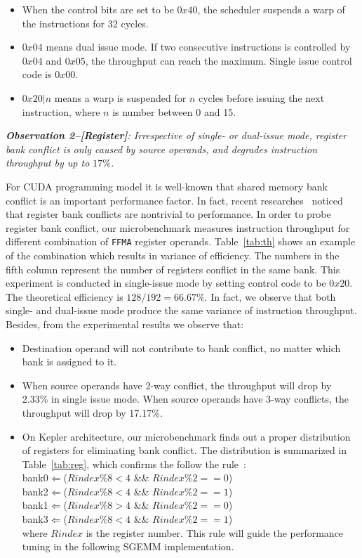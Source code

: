 \documentclass{sig-alternate-05-2015}
\begin{document}
\begin{itemize}
\item When the control bits are set to be $0x40$, the scheduler suspends a warp of the instructions for 32 cycles.
\item $0x04$ means dual issue mode. If two consecutive instructions is controlled by $0x04$ and $0x05$, the throughput can reach the maximum. Single issue control code is $0x00$.
\item $0x20|n$ means a warp is suspended for $n$ cycles before issuing the next instruction, where $n$ is number between 0 and 15.
\end{itemize}


{\em {\bf Observation 2--[Register]}: Irrespective of single- or dual-issue mode, register bank conflict is only caused by source operands, and degrades instruction throughput by up to $17\%$.}

For CUDA programming model it is well-known that shared memory bank conflict is an important performance factor. In
fact, recent researches~\cite{lai} noticed that register bank conflicts are nontrivial to performance.  In order to probe register bank conflict, our microbenchmark measures instruction throughput for different combination of {\tt FFMA} register operands. Table~\ref{tab:th} shows an example of the combination which results in variance of efficiency. The numbers in the fifth column represent the number of registers conflict in the same bank. This experiment is conducted in single-issue mode by setting control code to be $0x20$. The theoretical efficiency is $128/192=66.67\%$. In fact, we observe that both single- and dual-issue mode produce the same variance of instruction throughput. Besides, from the experimental results we observe that:
\begin{itemize}
\item Destination operand will not contribute to bank conflict, no matter which bank is assigned to it.
\item When source operands have 2-way conflict, the throughput will drop by 2.33\% in single issue
    mode. When source operands have 3-way conflicts, the throughput will drop by 17.17\%.

 \item On Kepler architecture, our microbenchmark finds out a proper distribution of registers for eliminating bank
     conflict. The distribution is summarized in Table~\ref{tab:reg}, which confirms the follow the rule~\cite{lai}: \\
 bank0$\Leftarrow$($Rindex \% 8 < 4$ \&\& $Rindex \% 2 == 0$) \\
 bank2$\Leftarrow$($Rindex \% 8 < 4$ \&\&
$Rindex \% 2 == 1$) \\
bank1$\Leftarrow$($Rindex \% 8 > 4$ \&\& $Rindex \%2 == 0$) \\
bank3$\Leftarrow$($Rindex \% 8 < 4$ \&\&
$Rindex\% 2 == 1$)\\
where $Rindex$ is the register number. This rule will guide the performance tuning in the following SGEMM implementation.

\end{itemize}
\end{document}
